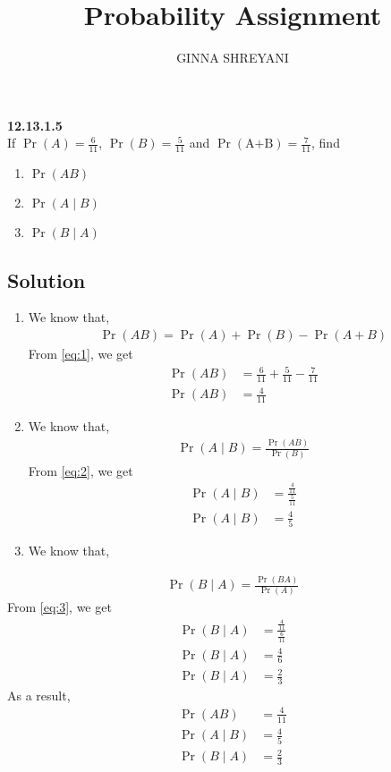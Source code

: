 \documentclass[10pt,twocolumn]{article}
\title{
Probability Assignment
}
\author{GINNA SHREYANI}
\date{}
\providecommand{\pr}[1]{\ensuremath{\Pr\left(#1\right)}}
\begin{document}
\maketitle


\textbf{12.13.1.5}\\
If $\pr{A}=\frac{6}{11}$, $\pr{B}=\frac{5}{11}$ and $\pr{\text{A+B}}=\frac{7}{11}$, find
\begin{enumerate}
	\item $\pr{AB}$   
	\item $\pr{A \mid B}$
	\item $\pr{B \mid A}$
\end{enumerate}
\subsection*{Solution}
\begin{enumerate}
	\item We know that,
\begin{align}
	\pr{AB} = \pr{A} + \pr{B} -\pr{A+B}
	\label{eq:1}
\end{align}
From \eqref{eq:1}, we get
\begin{align}
	\pr{AB} &= \frac{6}{11} + \frac{5}{11} - \frac{7}{11}\\
	\pr{AB} &= \frac{4}{11}
\end{align}
	\item We know that,
\begin{align}
	\pr{A \mid B} = \frac{\pr{AB}}{\pr{B}}
	\label{eq:2}
\end{align}
From \eqref{eq:2}, we get
\begin{align}
	\pr{A \mid B} &= \frac{\frac{4}{11}}{\frac{5}{11}}\\
	\pr{A \mid B} &= \frac{4}{5}
\end{align}
	\item We know that,
\end{enumerate}
\begin{align}
	\pr{B \mid A}=\frac{\pr{BA}}{\pr{A}}
	\label{eq:3}
\end{align}
From \eqref{eq:3}, we get
\begin{align}
	\pr{B \mid A} &= \frac{\frac{4}{11}}{\frac{6}{11}}\\
	\pr{B \mid A} &= \frac{4}{6}\\
	\pr{B \mid A} &= \frac{2}{3}
\end{align}
As a result,
\begin{align}
	\pr{AB} &= \frac{4}{11}\\
	\pr{A \mid B} &= \frac{4}{5}\\
	\pr{B \mid A} &= \frac{2}{3}
\end{align}
\end{document}
